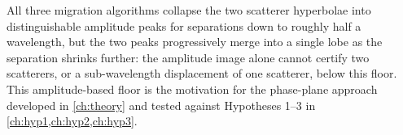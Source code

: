All three migration algorithms collapse the two scatterer hyperbolae into
distinguishable amplitude peaks for separations down to roughly half a
wavelength, but the two peaks progressively merge into a single lobe as the
separation shrinks further: the amplitude image alone cannot certify two
scatterers, or a sub-wavelength displacement of one scatterer, below this
floor.  This amplitude-based floor is the motivation for the
phase-plane approach developed in \cref{ch:theory} and tested against
Hypotheses 1--3 in \cref{ch:hyp1,ch:hyp2,ch:hyp3}.
